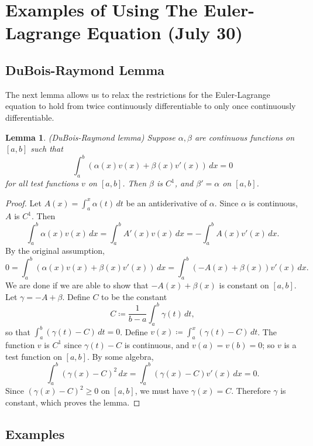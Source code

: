 \documentclass[11pt]{article}
\newtheorem{lemma}[theorem]{Lemma}
\begin{document}
\section{Examples of Using The Euler-Lagrange Equation (July 30)}

\subsection{DuBois-Raymond Lemma}

The next lemma allows us to relax the restrictions for the Euler-Lagrange equation to hold from twice continuously differentiable to only once continuously differentiable.
\begin{lemma}
(DuBois-Raymond lemma) Suppose $\alpha, \beta$ are continuous functions on $[a,b]$ such that
\[
\int_a^b ( \alpha(x)v(x) + \beta(x)v'(x) ) \, dx = 0
\]
for all test functions $v$ on $[a,b]$. Then $\beta$ is $C^1$, and $\beta' = \alpha$ on $[a,b]$.
\end{lemma}
\begin{proof}
Let $A(x) = \int_a^x \alpha(t) \, dt$ be an antiderivative of $\alpha$. Since $\alpha$ is continuous, $A$ is $C^1$. Then
\[
\int_a^b \alpha(x) v(x) \, dx = \int_a^b A'(x)v(x) \, dx = -\int_a^b A(x)v'(x) \, dx.
\]
By the original assumption,
\[
0 = \int_a^b (\alpha(x)v(x) + \beta(x)v'(x)) \, dx = \int_a^b(-A(x) + \beta(x))v'(x) \, dx.
\]
We are done if we are able to show that $-A(x) + \beta(x)$ is constant on $[a,b]$. Let $\gamma = -A + \beta$. Define $C$ to be the constant
\[
C \coloneqq \frac{1}{b-a}\int_a^b \gamma(t) \, dt,
\]
so that $\int_a^b (\gamma(t) - C) \, dt = 0$. Define $v(x) \coloneqq \int_a^x (\gamma(t) - C) \, dt$. The function $v$ is $C^1$ since $\gamma(t) - C$ is continuous, and $v(a) = v(b) = 0$; so $v$ is a test function on $[a,b]$. By some algebra,
\[
\int_a^b (\gamma(x) - C)^2 \, dx = \int_a^b (\gamma(x) - C)v'(x) \, dx = 0.
\]
Since $(\gamma(x) - C)^2 \geq 0$ on $[a,b]$, we must have $\gamma(x) = C$. Therefore $\gamma$ is constant, which proves the lemma.
\end{proof}

\subsection{Examples}
\end{document}
